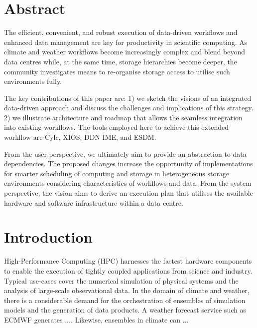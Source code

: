 \documentclass[a4paper]{article}
\title{\papertitle}
\author{Julian M. Kunkel
  \textit{University of Reading}
    \and
  Luciana R. Pedro
  \textit{University of Reading}
}
\date{\today}
\newcommand{\jk}[1]{\todo[inline]{JK: #1}}
\begin{document}
\maketitle
\thispagestyle{fancy}

\section*{Abstract}
The efficient, convenient, and robust execution of data-driven workflows and enhanced data management are key for productivity in scientific computing.
\sout{{\color{blue}{
Traditionally, in HPC, the concerns of storage and computing are separated and optimised independently from each other, and, moreover, independently from the needs of end-to-end user workflows that ultimately lead to insight.}}}
{\color{cyan}{
Traditionally, in HPC, the concerns of storage and computing are separated and optimised independently from each other and from the needs of end-to-end user.}}
As climate and weather workflows become increasingly complex and blend beyond data centres while, at the same time, storage hierarchies become deeper, the community investigates means to re-organise storage access to utilise such environments fully.

The key contributions of this paper are:
1) we sketch the visions of an integrated data-driven approach and discuss the challenges and implications of this strategy.
2) we illustrate architecture and roadmap that allows the seamless integration into existing workflows.
The tools employed here to achieve this extended workflow are Cylc, XIOS, DDN IME, and ESDM.

From the user perspective, we ultimately aim to provide an abstraction to data dependencies.
The proposed changes increase the opportunity of implementations for smarter scheduling of computing and storage in heterogeneous storage environments considering characteristics of workflows and data.
From the system perspective, the vision aims to derive an execution plan that utilises the available hardware and software infrastructure within a data centre.


\section{Introduction}

High-Performance Computing (HPC) harnesses the fastest hardware components to enable the execution of tightly coupled applications from science and industry.
Typical use-cases cover the numerical simulation of physical systems and the analysis of large-scale observational data.
In the domain of climate and weather, there is a considerable demand for the orchestration of ensembles of simulation models and the generation of data products.
A weather forecast service such as ECMWF generates .... \jk{Cylc team, please provide some facts}
Likewise, ensembles in climate can ...
\end{document}
